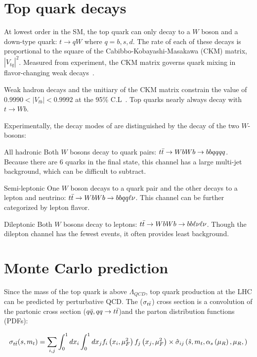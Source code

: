 \section{Top quark decays}
At lowest order in the SM, the top quark can only decay to a $W$ boson and a down-type quark: $t \rightarrow qW$ where $q=b,s,d$. The rate of each of these decays is proportional to the square of the Cabibbo-Kobayashi-Masakawa (CKM) matrix, $|V_{tq}|^2$. Measured from experiment, the CKM matrix governs quark mixing in flavor-changing weak decays~\cite{PDG}.

Weak hadron decays and the unitiary of the CKM matrix constrain the value of $0.9990 < |V_{tb}| < 0.9992$ at the 95\% C.L~\cite{Chetyrkin:1999ys}. Top quarks nearly always decay with $t \rightarrow Wb$.

Experimentally, the decay modes of \ttbar are distinguished by the decay of the two $W$-bosons:
\begin{list}
\item[All hadronic] Both $W$ bosons decay to quark pairs: $t\bar{t} \rightarrow WbWb \rightarrow bbqqqq$. Because there are 6 quarks in the final state, this channel has a large multi-jet background, which can be difficult to subtract. 

\item[Semi-leptonic] One $W$ boson decays to a quark pair and the other decays to a lepton and neutrino: $t\bar{t} \rightarrow WbWb \rightarrow bbqq \ell \nu$. This channel can be further categorized by lepton flavor.


\item[Dileptonic] Both $W$ bosons decay to leptons: $t\bar{t} \rightarrow WbWb \rightarrow bb\ell \nu\ell \nu$. Though the dilepton channel has the fewest events, it often provides least background.


\end{list} 



\section{Monte Carlo prediction}
Since the mass of the top quark is above $\Lambda_{QCD}$, top quark production at the LHC can be predicted by perturbative QCD. The \ttbar ($\sigma_{t\bar{t}}$) cross section is a convolution of the partonic cross section ($q\bar{q}, qq \rightarrow t\bar{t}$)and the parton distribution functions (PDFs):

\begin{equation}
\sigma_{t\bar{t}}(s, m_{t}) = \sum_{i, j} \int^1_0 dx_i  \int^1_0 dx_j f_i \left(x_i, \mu_F^2 \right) f_j\left(x_j, \mu_F^2 \right) \times \hat{\sigma}_{ij} \left( \hat{s}, m_{t}, \alpha_s \left(\mu_R \right), \mu_R,  \right)
\end{equation}


